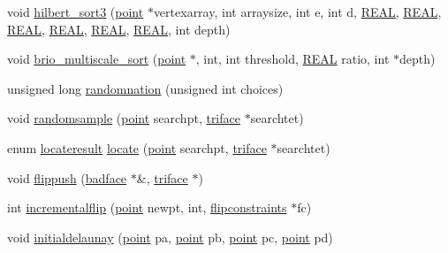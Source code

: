 \begin{DoxyCompactItemize}
\item 
void \hyperlink{classtetgenmesh_a49edbd210b6c45754eca98046b0ef477}{hilbert\+\_\+sort3} (\hyperlink{classtetgenmesh_ace3fb4f80389185b7c9b18ab69a3dea2}{point} $\ast$vertexarray, int arraysize, int e, int d, \hyperlink{tetgen_8h_a4b654506f18b8bfd61ad2a29a7e38c25}{R\+E\+AL}, \hyperlink{tetgen_8h_a4b654506f18b8bfd61ad2a29a7e38c25}{R\+E\+AL}, \hyperlink{tetgen_8h_a4b654506f18b8bfd61ad2a29a7e38c25}{R\+E\+AL}, \hyperlink{tetgen_8h_a4b654506f18b8bfd61ad2a29a7e38c25}{R\+E\+AL}, \hyperlink{tetgen_8h_a4b654506f18b8bfd61ad2a29a7e38c25}{R\+E\+AL}, \hyperlink{tetgen_8h_a4b654506f18b8bfd61ad2a29a7e38c25}{R\+E\+AL}, int depth)
\item 
void \hyperlink{classtetgenmesh_a3f09dd9fb2d975c75397a92aa6128565}{brio\+\_\+multiscale\+\_\+sort} (\hyperlink{classtetgenmesh_ace3fb4f80389185b7c9b18ab69a3dea2}{point} $\ast$, int, int threshold, \hyperlink{tetgen_8h_a4b654506f18b8bfd61ad2a29a7e38c25}{R\+E\+AL} ratio, int $\ast$depth)
\item 
unsigned long \hyperlink{classtetgenmesh_a0ae35b219eb4a0d1e0c14f9759cd6563}{randomnation} (unsigned int choices)
\item 
void \hyperlink{classtetgenmesh_aa05e91020e6e60c4bc589571c64ae646}{randomsample} (\hyperlink{classtetgenmesh_ace3fb4f80389185b7c9b18ab69a3dea2}{point} searchpt, \hyperlink{classtetgenmesh_1_1triface}{triface} $\ast$searchtet)
\item 
enum \hyperlink{classtetgenmesh_a1d02bed7b59566d57b896776d78a6b25}{locateresult} \hyperlink{classtetgenmesh_ab7e928e48e58e51513c615284eb7de70}{locate} (\hyperlink{classtetgenmesh_ace3fb4f80389185b7c9b18ab69a3dea2}{point} searchpt, \hyperlink{classtetgenmesh_1_1triface}{triface} $\ast$searchtet)
\item 
void \hyperlink{classtetgenmesh_a5ffeb14717bdf9867aa29a9d9487013f}{flippush} (\hyperlink{classtetgenmesh_1_1badface}{badface} $\ast$\&, \hyperlink{classtetgenmesh_1_1triface}{triface} $\ast$)
\item 
int \hyperlink{classtetgenmesh_a2388d9669cc9bb2a68943633bd5148ef}{incrementalflip} (\hyperlink{classtetgenmesh_ace3fb4f80389185b7c9b18ab69a3dea2}{point} newpt, int, \hyperlink{classtetgenmesh_1_1flipconstraints}{flipconstraints} $\ast$fc)
\item 
void \hyperlink{classtetgenmesh_a9b2f957a884b39c4d93c8695fa4b59d7}{initialdelaunay} (\hyperlink{classtetgenmesh_ace3fb4f80389185b7c9b18ab69a3dea2}{point} pa, \hyperlink{classtetgenmesh_ace3fb4f80389185b7c9b18ab69a3dea2}{point} pb, \hyperlink{classtetgenmesh_ace3fb4f80389185b7c9b18ab69a3dea2}{point} pc, \hyperlink{classtetgenmesh_ace3fb4f80389185b7c9b18ab69a3dea2}{point} pd)

\end{DoxyCompactItemize}
